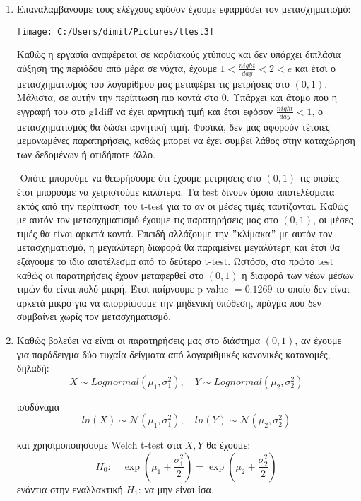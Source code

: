 \documentclass[oneside,a4paper]{article}
\newcommand {\tl}{\textlatin}
\begin{document}
\begin{enumerate}
    \vspace{1cm}
    \item  Επαναλαμβάνουμε τους ελέγχους εφόσον έχουμε εφαρμόσει τον μετασχηματισμό: 
    \begin{center}
        \texttt{[image: C:/Users/dimit/Pictures/ttest3]}
        \end{center}

        
Καθώς η εργασία αναφέρεται σε καρδιακούς χτύπους και δεν υπάρχει διπλάσια αύξηση της περιόδου από μέρα σε νύχτα, έχουμε $1<\frac{night}{day} < 2 < e$ και έτσι ο μετασχηματισμός του λογαρίθμου μας μεταφέρει τις μετρήσεις στο $(0,1)$. Μάλιστα, σε αυτήν την περίπτωση πιο κοντά στο $0$. Υπάρχει και άτομο που η εγγραφή του στο \tl{g1diff} να έχει αρνητική τιμή και έτσι εφόσον $\frac{night}{day}<1$, ο μετασχηματισμός θα δώσει αρνητική τιμή. Φυσικά, δεν μας αφορούν τέτοιες μεμονωμένες παρατηρήσεις, καθώς μπορεί να έχει συμβεί λάθος στην καταχώρηση των δεδομένων ή οτιδήποτε άλλο.

$ $\newline
Οπότε μπορούμε να θεωρήσουμε ότι έχουμε μετρήσεις στο $(0,1)$ τις οποίες έτσι μπορούμε να χειριστούμε καλύτερα.
Τα \tl{test} δίνουν όμοια αποτελέσματα εκτός από την περίπτωση του \tl{t-test} για το αν οι μέσες τιμές ταυτίζονται. Καθώς με αυτόν τον μετασχηματισμό έχουμε τις παρατηρήσεις μας στο $(0,1)$, οι μέσες τιμές θα είναι αρκετά κοντά. Επειδή αλλάζουμε την $"$κλίμακα$"$ με αυτόν τον μετασχηματισμό, η μεγαλύτερη διαφορά θα παραμείνει μεγαλύτερη και έτσι θα εξάγουμε το ίδιο αποτέλεσμα από το δεύτερο \tl{t-test}. Ωστόσο, στο πρώτο \tl{test} καθώς οι παρατηρήσεις έχουν μεταφερθεί στο $(0,1)$ η διαφορά των νέων μέσων τιμών θα είναι πολύ μικρή. Έτσι παίρνουμε \tl{p-value} $= 0.1269$ το οποίο δεν είναι αρκετά μικρό για να απορρίψουμε την μηδενική υπόθεση, πράγμα που δεν συμβαίνει χωρίς τον μετασχηματισμό.
    



\vspace{1cm}
\item Καθώς βολεύει να είναι οι παρατηρήσεις μας στο διάστημα $(0,1)$, αν έχουμε για παράδειγμα δύο τυχαία δείγματα από λογαριθμικές κανονικές κατανομές, δηλαδή: 
$$X \sim Lognormal(\mu_1 , \sigma^2_1),\quad  Y \sim Lognormal(\mu_2 , \sigma^2_2)$$

    ισοδύναμα
    $$ln(X) \sim \mathcal{N} (\mu_1 , \sigma^2_1),\quad ln(Y) \sim \mathcal{N} (\mu_2 , \sigma^2_2)$$
    
    και χρησιμοποιήσουμε \tl{Welch t-test} στα $X,Y$ θα έχουμε:
    $$H_0: \quad \exp\left(\mu_1 + \frac{\sigma^2_1}{2}\right) = \exp\left(\mu_2 + \frac{\sigma^2_2}{2}\right)$$
    ενάντια στην εναλλακτική $H_1$: να μην είναι ίσα.
    

\end{enumerate}
\end{document}
